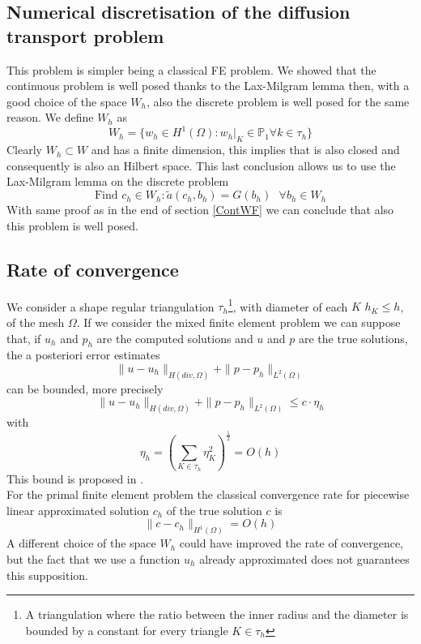 \documentclass[]{report}
\begin{document}
\subsection{Numerical discretisation of the diffusion transport problem}
This problem is simpler being a classical FE problem. We showed that the continuous problem is well posed thanks to the Lax-Milgram lemma then, with a good choice of the space $W_h$, also the discrete problem is well posed for the same reason.
We define $W_h$ as
\begin{equation}
	W_h=\{w_h\in H^1(\Omega):w_h|_K\in\mathbb{P}_1 \forall k\in\tau_h \}
\end{equation}
Clearly $W_h\subset W$ and has a finite dimension, this implies that is also closed and consequently is also an Hilbert space. This last conclusion allows us to use the Lax-Milgram lemma on the discrete problem
\begin{equation}
	\mbox{Find }c_h\in W_h: \tilde{a}(c_h,b_h)=G(b_h)\mbox{  }\forall b_h\in W_h
\end{equation}
With same proof as in the end of section \ref{ContWF} we can conclude that also this problem is well posed.
\subsection{Rate of convergence}
We consider a shape regular triangulation $\tau_h$\footnote{A triangulation where the ratio between the inner radius and the diameter is bounded by a constant for every triangle $K\in\tau_h$}, with diameter  of each $K$ $h_K\leq h$, of the mesh $\Omega$. If we consider the mixed finite element problem we can suppose that, if $u_h$ and $p_h$ are the computed solutions and $u$ and $p$ are the true solutions, the a posteriori error estimates 
\begin{equation*}
	\|u-u_h\|_{H(div,\Omega)}+\|p-p_h\|_{L^2(\Omega)}
\end{equation*}
can be bounded, more precisely
\begin{equation*}
\|u-u_h\|_{H(div,\Omega)}+\|p-p_h\|_{L^2(\Omega)}\leq c \cdot \eta_h
\end{equation*}
with
\begin{equation*}
\eta_h=(\sum_{K\in \tau_h}\eta_K^2)^{\frac{1}{2}}=O(h)
\end{equation*}
This bound is proposed in \cite{art:rif.1}.\\
For the primal finite element problem the classical convergence rate for piecewise linear approximated solution $c_h$ of the true solution $c$ is
\begin{equation*}
	\|c-c_h\|_{H^1(\Omega)}=O(h)
\end{equation*}
A different choice of the space $W_h$ could have improved the rate of convergence, but the fact that we use a function $u_h$ already approximated does not guarantees this supposition.
\end{document}
